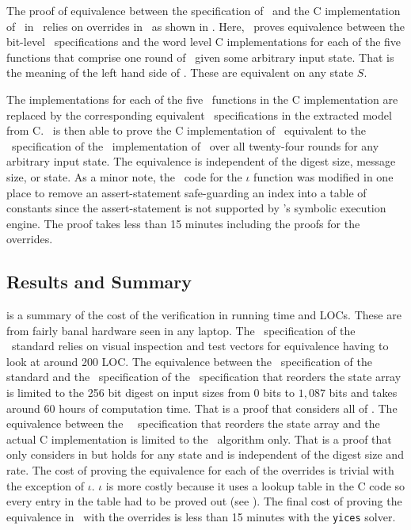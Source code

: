 The proof of equivalence between the specification of \keccak\ and the C implementation of \keccak\ in \openssl\ relies on overrides in \saw\ as shown in .
Here, \saw\ proves equivalence between the bit-level \cryptol\ specifications and the word level C implementations for each of the five functions that comprise one round of \keccak\ given some arbitrary input state.
That is the meaning of the left hand side of .
These are equivalent on any state $S$.

The implementations for each of the five \keccak\ functions in the C implementation are replaced by the corresponding equivalent \cryptol\ specifications in the extracted model from C.
\saw\ is then able to prove the C implementation of \keccak\ equivalent to the \cryptol\ specification of the \openssl\ implementation of \keccak\ over all twenty-four rounds for any arbitrary input state.
The equivalence is independent of the digest size, message size, or state.
As a minor note, the \openssl\ code for the $\iota$ function was modified in one place to remove an assert-statement safe-guarding an index into a table of constants since the assert-statement is not supported by \saw's symbolic execution engine. The proof takes less than 15 minutes including the proofs for the overrides.


\subsection{Results and Summary}

 is a summary of the cost of the verification in running time and LOCs. These are from fairly banal hardware seen in any laptop.
The \cryptol\ specification of the \fips\ standard relies on visual inspection and test vectors for equivalence having to look at around 200 LOC.
The equivalence between the \cryptol\ specification of the standard and the \cryptol\ specification of the \openssl\ specification that reorders the state array is limited to the 256 bit digest on input sizes from $0$ bits to $1,087$ bits and takes around 60 hours of computation time.
That is a proof that considers all of .
The equivalence between the \openssl\ \cryptol\ specification that reorders the state array and the actual C implementation is limited to the \keccak\ algorithm only.
That is a proof that only considers  in  but holds for any state and is independent of the digest size and rate.
The cost of proving the equivalence for each of the overrides is trivial with the exception of $\iota$.
$\iota$ is more costly because it uses a lookup table in the C code so every entry in the table had to be proved out (see ).
The final cost of proving the equivalence in \keccak\ with the overrides is less than 15 minutes with the \texttt{yices} solver.


